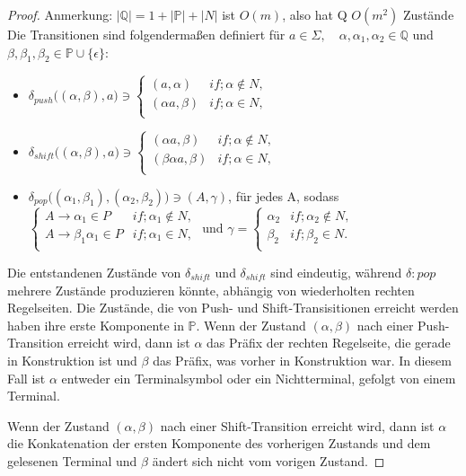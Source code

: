 \begin{proof}
Anmerkung: $|\mathbb{Q}|=1+|\mathbb{P}|+|N|$ ist $O(m)$, also hat Q $O(m^2)$ Zustände\\
Die Transitionen sind folgendermaßen definiert für $a\in \Sigma, \quad \alpha, \alpha_1, \alpha_2\in\mathbb{Q}$ und $\beta, \beta_1, \beta_2 \in \mathbb{P} \cup \{\epsilon\}$:
\begin{itemize}
\item
$\delta_{push}\big ( (\alpha, \beta),a \big )\ni 
\begin{cases}
(a, \alpha) & if; \alpha \notin N, \\
(\alpha a, \beta) & if;  \alpha \in N, \\
\end{cases}$
\item
$\delta_{shift}\big ( (\alpha, \beta),a \big )\ni 
\begin{cases}
(\alpha a, \beta) & if; \alpha \notin N, \\
(\beta\alpha a, \beta) & if;  \alpha \in N, \\
\end{cases}$
\item
$\delta_{pop}\big ( (\alpha_1, \beta_1), (\alpha_2, \beta_2) \big ) \ni (A, \gamma)$, für jedes A, sodass\\
$\begin{cases}
A\rightarrow \alpha_1\in P & if; \alpha_1 \notin N,\\
A\rightarrow \beta_1\alpha_1 \in P & if; \alpha_1 \in N,\\
\end{cases}$ und $\gamma= 
\begin{cases}
\alpha_2 & if; \alpha_2 \notin N, \\
\beta_2 & if; \beta_2 \in N. \\
\end{cases}$
\end{itemize}
Die entstandenen Zustände von $\delta_{shift}$ und $\delta_{shift}$ sind eindeutig, während $\delta:{pop}$ mehrere Zustände produzieren könnte, abhängig von wiederholten rechten Regelseiten. Die Zustände, die von Push- und Shift-Transisitionen erreicht werden haben ihre erste Komponente in $\mathbb{P}$. Wenn der Zustand $(\alpha, \beta)$ nach einer Push-Transition erreicht wird, dann ist $\alpha$ das Präfix der rechten Regelseite, die gerade in Konstruktion ist und $\beta$ das Präfix, was vorher in Konstruktion war. In diesem Fall ist $\alpha$ entweder ein Terminalsymbol oder ein Nichtterminal, gefolgt von einem Terminal.

Wenn der Zustand $(\alpha, \beta)$ nach einer Shift-Transition erreicht wird, dann ist $\alpha$ die Konkatenation der ersten Komponente des vorherigen Zustands und dem gelesenen Terminal und $\beta$ ändert sich nicht vom vorigen Zustand.


\end{proof}
